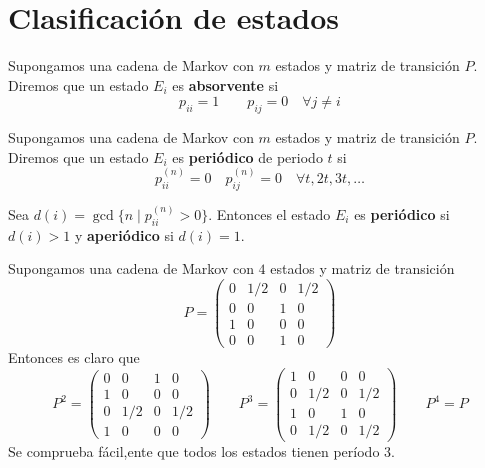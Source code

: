\documentclass[PREyA.tex]{subfiles}
\begin{document}
\section{Clasificación de estados}
\begin{defi}
Supongamos una cadena de Markov con $m$ estados y matriz de transición $P$. Diremos que un estado $E_i$ es \textbf{absorvente} si 
$$
p_{ii} = 1 \qquad p_{ij} = 0 \quad \forall j \neq i
$$
\end{defi}
\begin{defi}
Supongamos una cadena de Markov con $m$ estados y matriz de transición $P$. Diremos que un estado $E_i$ es \textbf{periódico} de periodo $t$ si 
$$
p_{ii}^{(n)} = 0  \quad p_{ij}^{(n)} = 0 \quad \forall t,2t,3t,\dotsc
$$
\end{defi}
\begin{defi}
Sea $d(i) = \gcd\{n\mid p_{ii}^{(n)}>0\}$. Entonces el estado $E_i$ es \textbf{periódico} si $d(i)>1$ y \textbf{aperiódico} si $d(i)=1$.
\end{defi}
\begin{example}
Supongamos una cadena de Markov con $4$ estados y matriz de transición
$$P = 
\begin{pmatrix}
0 & 1/2 & 0 & 1/2\\
0 & 0  & 1 & 0\\
1 & 0 & 0 & 0\\
0 & 0 & 1 & 0
\end{pmatrix}
$$
Entonces es claro que
$$P^2 = 
\begin{pmatrix}
0 & 0 & 1 & 0\\
1 & 0  & 0 & 0\\
0 & 1/2 & 0 & 1/2 \\
1 & 0 & 0 & 0
\end{pmatrix} \qquad P^3= \begin{pmatrix}
1 & 0 & 0 & 0\\
0 & 1/2  & 0 & 1/2\\
1 & 0 & 1 & 0\\
0 & 1/2 & 0 & 1/2
\end{pmatrix}
\qquad P^4 = P
$$
Se comprueba fácil,ente que todos los estados tienen período $3$.
\end{example}
\end{document}
